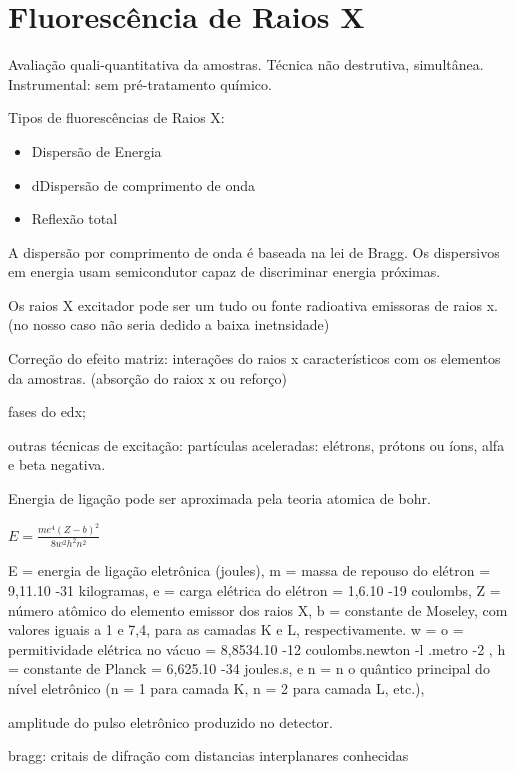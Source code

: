 \section{Fluorescência de Raios X}

Avaliação quali-quantitativa da amostras. Técnica não destrutiva, simultânea. 
Instrumental: sem pré-tratamento químico. 

Tipos de fluorescências de Raios X:

\begin{itemize}
  \item Dispersão de Energia
  \item dDispersão de comprimento de onda
  \item Reflexão total
\end{itemize}

A dispersão por comprimento de onda é baseada na lei de Bragg. Os dispersivos 
em energia usam semicondutor capaz de discriminar energia próximas. 

Os raios X excitador pode ser um tudo ou fonte radioativa emissoras de raios x. 
(no nosso caso não seria dedido a baixa inetnsidade)

Correção do efeito matriz: interações do raios x característicos com os 
elementos da amostras. (absorção do raiox x ou reforço)

fases do edx;

outras técnicas de excitação: partículas aceleradas: elétrons, prótons ou íons,
 alfa e beta negativa.

Energia de ligação pode ser aproximada pela teoria atomica de bohr.

\begin{math}
E = \frac{me^4(Z-b)^2}{8w^2h^2n^2}
\end{math}

E = energia de ligação eletrônica (joules),
m = massa de repouso do elétron = 9,11.10 -31 kilogramas,
e = carga elétrica do elétron = 1,6.10 -19 coulombs,
Z = número atômico do elemento emissor dos raios X,
b = constante de Moseley, com valores iguais a 1 e 7,4, para as camadas K e L,
respectivamente.
w = o = permitividade elétrica no vácuo = 8,8534.10 -12 coulombs.newton -l .metro -2 ,
h = constante de Planck = 6,625.10 -34 joules.s, e
n = n o quântico principal do nível eletrônico (n = 1 para camada K, n = 2 para
camada L, etc.),

amplitude do pulso eletrônico produzido no detector.

bragg: critais de difração com distancias interplanares conhecidas 

